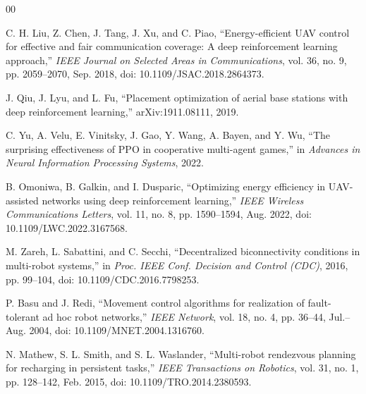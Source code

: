 \documentclass[conference]{IEEEtran}
\begin{document}
\balance
\renewcommand{\IEEEbibitemsep}{0pt}
\begin{thebibliography}{00}

C. H. Liu, Z. Chen, J. Tang, J. Xu, and C. Piao, ``Energy-efficient UAV control for effective and fair communication coverage: A deep reinforcement learning approach,'' \emph{IEEE Journal on Selected Areas in Communications}, vol. 36, no. 9, pp. 2059--2070, Sep. 2018, doi: 10.1109/JSAC.2018.2864373.

J. Qiu, J. Lyu, and L. Fu, ``Placement optimization of aerial base stations with deep reinforcement learning,'' arXiv:1911.08111, 2019.

C. Yu, A. Velu, E. Vinitsky, J. Gao, Y. Wang, A. Bayen, and Y. Wu, ``The surprising effectiveness of PPO in cooperative multi-agent games,'' in \emph{Advances in Neural Information Processing Systems}, 2022.

B. Omoniwa, B. Galkin, and I. Dusparic, ``Optimizing energy efficiency in UAV-assisted networks using deep reinforcement learning,'' \emph{IEEE Wireless Communications Letters}, vol. 11, no. 8, pp. 1590--1594, Aug. 2022, doi: 10.1109/LWC.2022.3167568.

M. Zareh, L. Sabattini, and C. Secchi, ``Decentralized biconnectivity conditions in multi-robot systems,'' in \emph{Proc. IEEE Conf. Decision and Control (CDC)}, 2016, pp. 99--104, doi: 10.1109/CDC.2016.7798253.

P. Basu and J. Redi, ``Movement control algorithms for realization of fault-tolerant ad hoc robot networks,'' \emph{IEEE Network}, vol. 18, no. 4, pp. 36--44, Jul.--Aug. 2004, doi: 10.1109/MNET.2004.1316760.

N. Mathew, S. L. Smith, and S. L. Waslander, ``Multi-robot rendezvous planning for recharging in persistent tasks,'' \emph{IEEE Transactions on Robotics}, vol. 31, no. 1, pp. 128--142, Feb. 2015, doi: 10.1109/TRO.2014.2380593.


\end{thebibliography}
\end{document}
